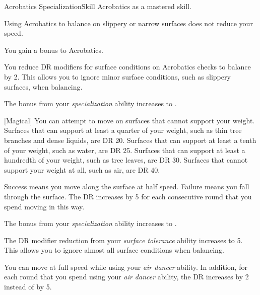     \begin{feat}{Acrobatics Specialization}{Skill}
        \featpre Acrobatics as a mastered skill.

         Using Acrobatics to balance on slippery or narrow surfaces does not reduce your speed.

         You gain a  bonus to Acrobatics.

         You reduce DR modifiers for surface conditions on Acrobatics checks to balance by 2.
        This allows you to ignore minor surface conditions, such as slippery surfaces, when balancing.

         The bonus from your \textit{specialization} ability increases to .

        [Magical] You can attempt to move on surfaces that cannot support your weight.
        Surfaces that can support at least a quarter of your weight, such as thin tree branches and dense liquids, are DR 20.
        Surfaces that can support at least a tenth of your weight, such as water, are DR 25.
        Surfaces that can support at least a hundredth of your weight, such as tree leaves, are DR 30.
        Surfaces that cannot support your weight at all, such as air, are DR 40.

        Success means you move along the surface at half speed.
        Failure means you fall through the surface.
        The DR increases by 5 for each consecutive round that you spend moving in this way.

         The bonus from your \textit{specialization} ability increases to .

         The DR modifier reduction from your \textit{surface tolerance} ability increases to 5.
        This allows you to ignore almost all surface conditions when balancing.

         You can move at full speed while using your \textit{air dancer} ability.
        In addition, for each round that you spend using your \textit{air dancer} ability, the DR increases by 2 instead of by 5.
    \end{feat}

